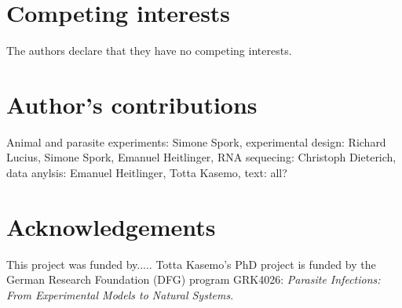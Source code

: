 \documentclass{bmcart}
\begin{document}
\begin{backmatter}

\section*{Competing interests}
  The authors declare that they have no competing interests.

\section*{Author's contributions}
Animal and parasite experiments: Simone Spork, experimental design: Richard Lucius, Simone Spork, Emanuel Heitlinger, RNA sequecing: Christoph Dieterich, data anylsis: Emanuel Heitlinger, Totta Kasemo, text: all?

\section*{Acknowledgements}
This project was funded by..... Totta Kasemo's PhD project is funded by the German Research Foundation (DFG) program GRK4026: \textit{Parasite Infections: From Experimental Models to Natural Systems}. 




\end{backmatter}
\end{document}
